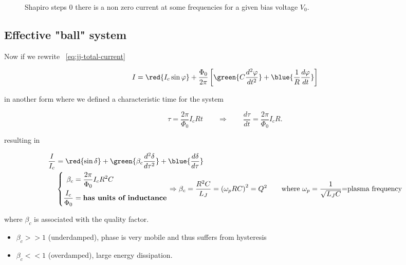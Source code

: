 \begin{figure}[h]
  \centering {}
  \caption{\small  Shapiro  steps 0  there  is  a  non  zero current  at  some  frequencies  for  a given  bias  voltage
    $V_0$. \label{fig:jj_shapiro_step_at_frequency}}
\end{figure}


\subsection{Effective "ball" system}
\label{sec:effect-ball-syst}

Now if we rewrite ~\autoref{eq:jj-total-current}

\begin{equation}\label{eq:jj-force-equation}
  I = \red{I_c\sin\varphi} + \frac{\Phi_0}{2\pi}\left[ \green{C
      \frac{d^2\varphi}{dt^{2}}}                                +
    \blue{\frac{1}{R}\frac{d\varphi}{dt}} \right]
\end{equation}

\noindent in another form where we defined a characteristic time for the system

\begin{equation}
  \tau = \frac{2\pi}{\Phi_0}I_cR t  \qquad \Rightarrow \qquad \frac{d\tau}{dt} = \frac{2\pi}{\Phi_0}I_cR.
\end{equation}

\noindent resulting in

\begin{equation}
  \begin{aligned}
    \frac{I}{I_c} &= \red{\sin\delta} + \green{\beta_{c} \frac{d^2\delta}{d\tau^2}} + \blue{\frac{d\delta}{d\tau}} \\
    & \left\lbrace
      \begin{aligned}
        \beta_c & = \frac{2\pi}{\Phi_0}I_cR^2C\\
        \frac{I_c}{\Phi_0} & = \textbf{has units of inductance}
      \end{aligned}
    \right.   \Rightarrow  \beta_c  =  \frac{R^2C}{L_J}  =  \left(  \omega_pRC   \right)^2  =  Q^2  \qquad  \text{where  }  \omega_p  =
    \frac{1}{\sqrt{L_JC}} \text{=plasma frequency}
  \end{aligned}
\end{equation}

\noindent where $\beta_c$ is associated with the quality factor.
\begin{itemize}
\item $\beta_c>> 1$ (underdamped), phase is very mobile and thus suffers from hysteresis
\item $\beta_c << 1$ (overdamped), large energy dissipation.
\end{itemize}

